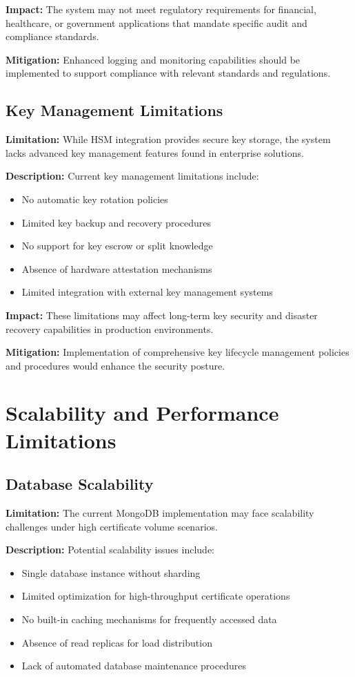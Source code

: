 \textbf{Impact:} The system may not meet regulatory requirements for financial, healthcare, or government applications that mandate specific audit and compliance standards.

\textbf{Mitigation:} Enhanced logging and monitoring capabilities should be implemented to support compliance with relevant standards and regulations.

\subsection{Key Management Limitations}

\textbf{Limitation:} While HSM integration provides secure key storage, the system lacks advanced key management features found in enterprise solutions.

\textbf{Description:} Current key management limitations include:
\begin{itemize}
    \item No automatic key rotation policies
    \item Limited key backup and recovery procedures
    \item No support for key escrow or split knowledge
    \item Absence of hardware attestation mechanisms
    \item Limited integration with external key management systems
\end{itemize}

\textbf{Impact:} These limitations may affect long-term key security and disaster recovery capabilities in production environments.

\textbf{Mitigation:} Implementation of comprehensive key lifecycle management policies and procedures would enhance the security posture.

\section{Scalability and Performance Limitations}

\subsection{Database Scalability}

\textbf{Limitation:} The current MongoDB implementation may face scalability challenges under high certificate volume scenarios.

\textbf{Description:} Potential scalability issues include:
\begin{itemize}
    \item Single database instance without sharding
    \item Limited optimization for high-throughput certificate operations
    \item No built-in caching mechanisms for frequently accessed data
    \item Absence of read replicas for load distribution
    \item Lack of automated database maintenance procedures
\end{itemize}

